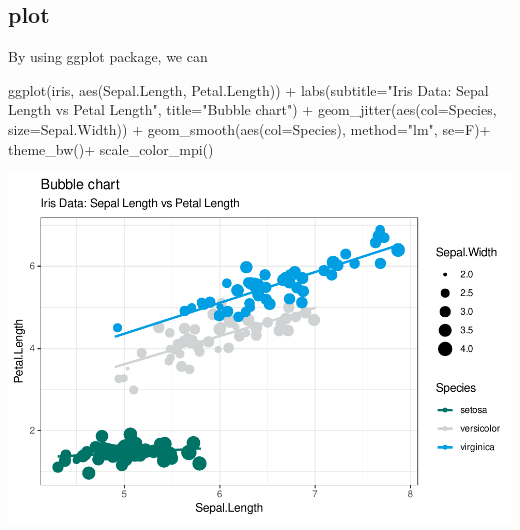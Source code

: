 \documentclass[
]{article}
\newenvironment{Shaded}{\begin{snugshade}}{\end{snugshade}}
\newcommand{\AttributeTok}[1]{\textcolor[rgb]{0.77,0.63,0.00}{#1}}
\newcommand{\FunctionTok}[1]{\textcolor[rgb]{0.00,0.00,0.00}{#1}}
\newcommand{\NormalTok}[1]{#1}
\newcommand{\SpecialCharTok}[1]{\textcolor[rgb]{0.00,0.00,0.00}{#1}}
\newcommand{\StringTok}[1]{\textcolor[rgb]{0.31,0.60,0.02}{#1}}
\begin{document}
\hypertarget{plot}{%
\subsection{plot}\label{plot}}

By using ggplot package, we can

\begin{Shaded}
\begin{Highlighting}[]
\FunctionTok{ggplot}\NormalTok{(iris, }\FunctionTok{aes}\NormalTok{(Sepal.Length, Petal.Length)) }\SpecialCharTok{+} 
  \FunctionTok{labs}\NormalTok{(}\AttributeTok{subtitle=}\StringTok{"Iris Data: Sepal Length vs Petal Length"}\NormalTok{,}
       \AttributeTok{title=}\StringTok{"Bubble chart"}\NormalTok{) }\SpecialCharTok{+} 
  \FunctionTok{geom\_jitter}\NormalTok{(}\FunctionTok{aes}\NormalTok{(}\AttributeTok{col=}\NormalTok{Species, }\AttributeTok{size=}\NormalTok{Sepal.Width)) }\SpecialCharTok{+} 
  \FunctionTok{geom\_smooth}\NormalTok{(}\FunctionTok{aes}\NormalTok{(}\AttributeTok{col=}\NormalTok{Species), }\AttributeTok{method=}\StringTok{"lm"}\NormalTok{, }\AttributeTok{se=}\NormalTok{F)}\SpecialCharTok{+}
  \FunctionTok{theme\_bw}\NormalTok{()}\SpecialCharTok{+}
  \FunctionTok{scale\_color\_mpi}\NormalTok{()}
\end{Highlighting}
\end{Shaded}

\begin{center}\includegraphics{figure/scatterPlot-1} \end{center}
\end{document}
